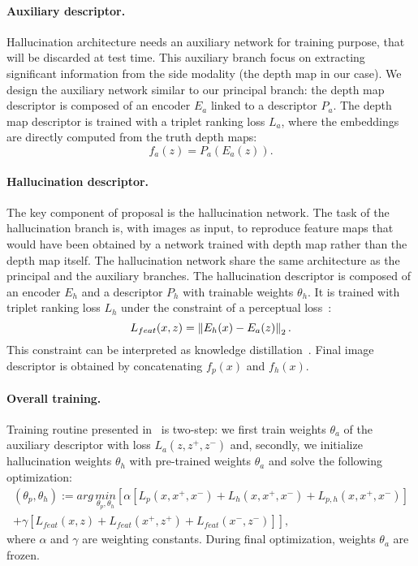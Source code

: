 \paragraph{Auxiliary descriptor.}
Hallucination architecture needs an auxiliary network for training purpose, that will be discarded at test time. This auxiliary branch focus on extracting significant information from the side modality (the depth map in our case). We design the auxiliary network similar to our principal branch: the depth map descriptor is composed of an encoder $E_a$ linked to a descriptor $P_a$. The depth map descriptor is trained with a triplet ranking loss $L_a$, where the embeddings are directly computed from the truth depth maps:
\begin{equation}
	f_a(z) = P_a(E_a(z)).
\end{equation}

\paragraph{Hallucination descriptor.} The key component of \citet{Hoffman2016} proposal is the hallucination network. The task of the hallucination branch is, with images as input, to reproduce feature maps that would have been obtained by a network trained with depth map rather than the depth map itself. The hallucination network share the same architecture as the principal and the auxiliary branches. The hallucination descriptor is composed of an encoder $E_h$ and a descriptor $P_h$ with trainable weights $\theta_h$. It is trained with triplet ranking loss $L_h$ under the constraint of a perceptual loss~\citep{Johnson2016}:
\begin{equation}
	\label{eq:perceptual_loss}
	L_{feat}(x, z) = \left\lVert E_h(x) - E_a(z)\right\rVert_2.
\end{equation}
This constraint can be interpreted as knowledge distillation~\citep{hinton2015distilling}. Final image descriptor is obtained by concatenating $f_p(x)$ and $f_h(x)$.

\paragraph{Overall training.} Training routine presented in~\citep{Hoffman2016} is two-step: we first train weights $\theta_a$ of the auxiliary descriptor with loss $L_a(z, z^+, z^-)$ and, secondly, we initialize hallucination weights $\theta_h$ with pre-trained weights $\theta_a$ and solve the following optimization:
\begin{multline}
	\label{eq:overall_hall_loss}
	\left( \theta_{p}, \theta_{h} \right) := arg\,\underset{\theta_p, \theta_h}{min} \left[ \alpha\left[ L_p(x, x^+, x^-) + L_h(x, x^+, x^-) + L_{p,h}(x, x^+, x^-) \right] \right. \\
	\left. + \gamma\left[ L_{feat}(x, z) + L_{feat}(x^+, z^+) + L_{feat}(x^-, z^-) \right] \right],
\end{multline}
where $\alpha$ and $\gamma$ are weighting constants. During final optimization, weights $\theta_a$ are frozen. 

